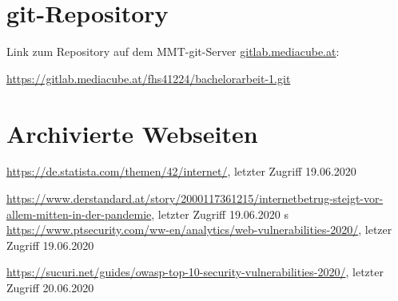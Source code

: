 \begin{appendices}



\section{git-Repository}

Link zum Repository auf dem MMT-git-Server {\url{gitlab.mediacube.at}}:

{\color{red}\url{https://gitlab.mediacube.at/fhs41224/bachelorarbeit-1.git}}

\section{Archivierte Webseiten}
\sloppy







\url{https://de.statista.com/themen/42/internet/}, letzter Zugriff 19.06.2020

\url{https://www.derstandard.at/story/2000117361215/internetbetrug-steigt-vor-allem-mitten-in-der-pandemie}, letzter Zugriff 19.06.2020
s
\url{https://www.ptsecurity.com/ww-en/analytics/web-vulnerabilities-2020/}, letzer Zugriff 19.06.2020

\url{https://sucuri.net/guides/owasp-top-10-security-vulnerabilities-2020/}, letzter Zugriff 20.06.2020






\end{appendices}
